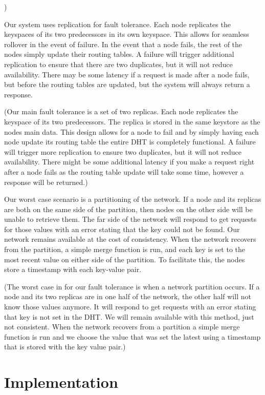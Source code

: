 \documentclass[11pt]{article}
\begin{document}
)

Our system uses replication for fault tolerance. Each node replicates the keyspaces of its two predecessors in its own keyspace. This allows for seamless rollover in the event of failure. In the event that a node fails, the rest of the nodes simply update their routing tables. A failure will trigger additional replication to ensure that there are two duplicates, but it will not reduce availability. There may be some latency if a request is made after a node fails, but before the routing tables are updated, but the system will always return a response.

(Our main fault tolerance is a set of two replicas. Each node replicates the keyspace of its two predecessors. The replica is stored in the same keystore as the nodes main data. This design allows for a node to fail and by simply having each node update its routing table the entire DHT is completely functional. A failure will trigger more replication to ensure two duplicates, but it will not reduce availability. There might be some additional latency if you make a request right after a node fails as the routing table update will take some time, however a response will be returned.)

Our worst case scenario is a partitioning of the network. If a node and its replicas are both on the same side of the partition, then nodes on the other side will be unable to retrieve them. The far side of the network will respond to get requests for those values with an error stating that the key could not be found. Our network remains available at the cost of consistency. When the network recovers from the partition, a simple merge function is run, and each key is set to the most recent value on either side of the partition. To facilitate this, the nodes store a timestamp with each key-value pair.

(The worst case in for our fault tolerance is when a network partition occurs. If a node and its two replicas are in one half of the network, the other half will not know those values anymore.  It will respond to get requests with an error stating that key is not set in the DHT. We will remain available with this method, just not consistent. When the network recovers from a partition a simple merge function is run and we choose the value that was set the latest using a timestamp that is stored with the key value pair.)

\section{Implementation}\label{sec:imple}
\end{document}
